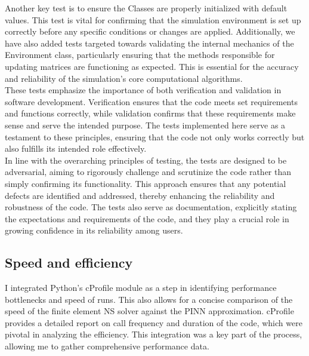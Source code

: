 Another key test is to ensure the Classes are properly initialized with default values. This test is vital for confirming that the simulation environment is set up correctly before any specific conditions or changes are applied. Additionally, we have also added tests targeted towards validating the internal mechanics of the Environment class, particularly ensuring that the methods responsible for updating matrices are functioning as expected. This is essential for the accuracy and reliability of the simulation's core computational algorithms. 
\\

These tests emphasize the importance of both verification and validation in software development. Verification ensures that the code meets set requirements and functions correctly, while validation confirms that these requirements make sense and serve the intended purpose. The tests implemented here serve as a testament to these principles, ensuring that the code not only works correctly but also fulfills its intended role effectively.
\\

In line with the overarching principles of testing, the tests are designed to be adversarial, aiming to rigorously challenge and scrutinize the code rather than simply confirming its functionality. This approach ensures that any potential defects are identified and addressed, thereby enhancing the reliability and robustness of the code. The tests also serve as documentation, explicitly stating the expectations and requirements of the code, and they play a crucial role in growing confidence in its reliability among users.

\subsection{Speed and efficiency}

I integrated Python's cProfile \cite{cprofile} module as a step in identifying performance bottlenecks and speed of runs.
This also allows for a concise comparison of the speed of the finite element NS solver against the PINN approximation. cProfile provides a detailed report on call frequency and duration of the code, which were pivotal in analyzing the efficiency. This integration was a key part of the process, allowing me to gather comprehensive performance data.
\\

